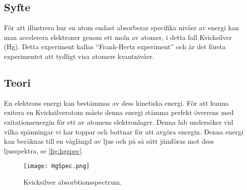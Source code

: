 \subsection*{Syfte}
För att illustrera hur en atom endast absorberar specifika nivåer av energi kan man accelerera elektroner genom ett moln av atomer, i detta fall Kvicksilver (Hg). 
Detta experiment kallas ``Frank-Hertz experiment'' och är det första experimentet att tydligt visa atomers kvantnivåer.

\subsection*{Teori}
En elektrons energi kan bestämmas av dess kinetiska energi. För att kunna exitera en Kvicksilveratom måste denna energi stämma perfekt överrens med exitationsenergin för ett av atomens elektronlager.
Denna lab undersöker vid vilka spänningar vi har toppar och bottnar för att avgöra energin. Denna energi kan beräknas till en våglängd av ljus och på så sätt jämföras mot dess ljusspektra, se \autoref{fig:hgspec}.%

\begin{figure}[h]
	\centering
	\texttt{[image: HgSpec.png]}
	\caption{Kvicksilver absorbtionsspectrum.\cite{astronoo}}
	\label{fig:hgspec}
\end{figure}

